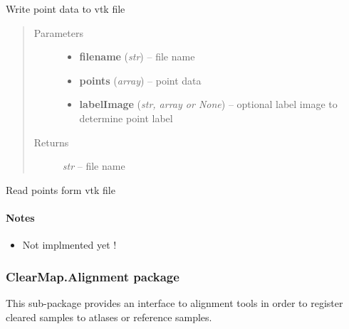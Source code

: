 \documentclass[letterpaper,10pt,english]{sphinxmanual}
\begin{document}
\begin{fulllineitems}
\label{api/ClearMap.IO:ClearMap.IO.VTK.writePoints}
Write point data to vtk file
\begin{quote}\begin{description}
\item[{Parameters}] \leavevmode\begin{itemize}
\item {} 
\textbf{filename} (\emph{str}) --
file name

\item {} 
\textbf{points} (\emph{array}) --
point data

\item {} 
\textbf{labelImage} (\emph{str, array or None}) --
optional label image to determine point label

\end{itemize}

\item[{Returns}] \leavevmode
\emph{str} --
file name

\end{description}\end{quote}

\end{fulllineitems}


\begin{fulllineitems}
\label{api/ClearMap.IO:ClearMap.IO.VTK.readPoints}
Read points form vtk file
\paragraph{Notes}
\begin{itemize}
\item {} 
Not implmented yet !

\end{itemize}

\end{fulllineitems}



\subsubsection{ClearMap.Alignment package}
\label{api/ClearMap.Alignment::doc}\label{api/ClearMap.Alignment:clearmap-alignment-package}\label{api/ClearMap.Alignment:module-ClearMap.Alignment}
This sub-package provides an interface to alignment tools in order to
register cleared samples to atlases or reference samples.
\end{document}
